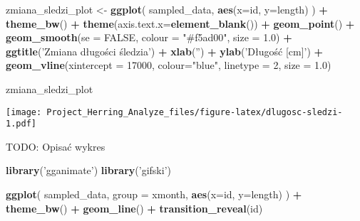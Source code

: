 \documentclass[]{article}
\newenvironment{Shaded}{\begin{snugshade}}{\end{snugshade}}
\newcommand{\DataTypeTok}[1]{\textcolor[rgb]{0.13,0.29,0.53}{#1}}
\newcommand{\DecValTok}[1]{\textcolor[rgb]{0.00,0.00,0.81}{#1}}
\newcommand{\FloatTok}[1]{\textcolor[rgb]{0.00,0.00,0.81}{#1}}
\newcommand{\KeywordTok}[1]{\textcolor[rgb]{0.13,0.29,0.53}{\textbf{#1}}}
\newcommand{\NormalTok}[1]{#1}
\newcommand{\OperatorTok}[1]{\textcolor[rgb]{0.81,0.36,0.00}{\textbf{#1}}}
\newcommand{\OtherTok}[1]{\textcolor[rgb]{0.56,0.35,0.01}{#1}}
\newcommand{\StringTok}[1]{\textcolor[rgb]{0.31,0.60,0.02}{#1}}
\begin{document}
\begin{Shaded}
\begin{Highlighting}[]
\NormalTok{zmiana_sledzi_plot <-}\StringTok{ }\KeywordTok{ggplot}\NormalTok{(}
\NormalTok{  sampled_data,}
  \KeywordTok{aes}\NormalTok{(}\DataTypeTok{x=}\NormalTok{id, }\DataTypeTok{y=}\NormalTok{length)}
\NormalTok{) }\OperatorTok{+}\StringTok{ }\KeywordTok{theme_bw}\NormalTok{() }\OperatorTok{+}\StringTok{ }
\StringTok{  }\KeywordTok{theme}\NormalTok{(}\DataTypeTok{axis.text.x=}\KeywordTok{element_blank}\NormalTok{()) }\OperatorTok{+}\StringTok{ }\KeywordTok{geom_point}\NormalTok{() }\OperatorTok{+}\StringTok{ }\KeywordTok{geom_smooth}\NormalTok{(}\DataTypeTok{se =} \OtherTok{FALSE}\NormalTok{, }\DataTypeTok{colour =} \StringTok{"#f5ad00"}\NormalTok{, }\DataTypeTok{size =} \FloatTok{1.0}\NormalTok{) }\OperatorTok{+}\StringTok{ }\KeywordTok{ggtitle}\NormalTok{(}\StringTok{'Zmiana długości śledzia'}\NormalTok{) }\OperatorTok{+}\StringTok{  }\KeywordTok{xlab}\NormalTok{(}\StringTok{''}\NormalTok{) }\OperatorTok{+}\StringTok{ }\KeywordTok{ylab}\NormalTok{(}\StringTok{'Długość [cm]'}\NormalTok{) }\OperatorTok{+}\StringTok{ }\KeywordTok{geom_vline}\NormalTok{(}\DataTypeTok{xintercept =} \DecValTok{17000}\NormalTok{, }\DataTypeTok{colour=}\StringTok{"blue"}\NormalTok{, }\DataTypeTok{linetype =} \DecValTok{2}\NormalTok{, }\DataTypeTok{size =} \FloatTok{1.0}\NormalTok{)}

\NormalTok{zmiana_sledzi_plot}
\end{Highlighting}
\end{Shaded}

\texttt{[image: Project\_Herring\_Analyze\_files/figure-latex/dlugosc-sledzi-1.pdf]}

TODO: Opisać wykres

\begin{Shaded}
\begin{Highlighting}[]
\KeywordTok{library}\NormalTok{(}\StringTok{'gganimate'}\NormalTok{)}
\KeywordTok{library}\NormalTok{(}\StringTok{'gifski'}\NormalTok{)}

\KeywordTok{ggplot}\NormalTok{(}
\NormalTok{  sampled_data,}
  \DataTypeTok{group =}\NormalTok{ xmonth,}
  \KeywordTok{aes}\NormalTok{(}\DataTypeTok{x=}\NormalTok{id, }\DataTypeTok{y=}\NormalTok{length)}
\NormalTok{) }\OperatorTok{+}\StringTok{ }\KeywordTok{theme_bw}\NormalTok{() }\OperatorTok{+}\StringTok{ }
\StringTok{  }\KeywordTok{geom_line}\NormalTok{() }\OperatorTok{+}\StringTok{ }\KeywordTok{transition_reveal}\NormalTok{(id)}
\end{Highlighting}
\end{Shaded}
\end{document}
